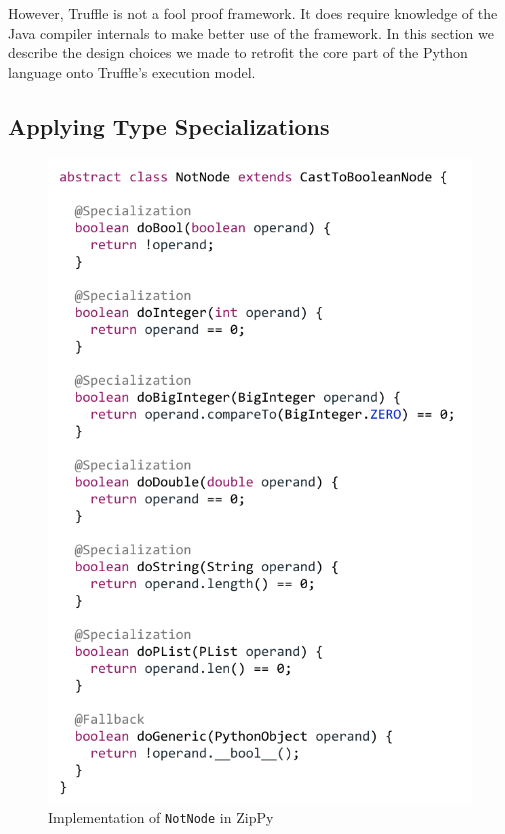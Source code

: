 However, Truffle is not a fool proof framework.
It does require knowledge of the Java compiler internals to make better use of the framework.
In this section we describe the design choices we made to retrofit the core part of the Python language onto Truffle's execution model.

\subsection{Applying Type Specializations}

\begin{figure}[t]
\centering
\includegraphics[scale=.8]{figures/ch3-not-node-code.pdf}
\caption{Implementation of \texttt{NotNode} in ZipPy}
\label{fig:not-node-code}
\end{figure}

